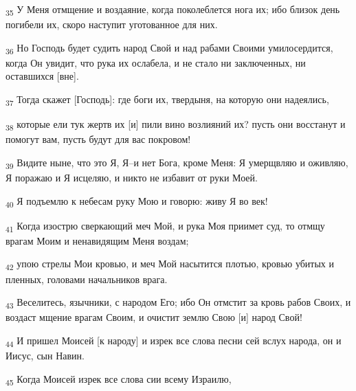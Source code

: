 \begin{tcolorbox}
\textsubscript{35} У Меня отмщение и воздаяние, когда поколеблется нога их; ибо близок день погибели их, скоро наступит уготованное для них.
\end{tcolorbox}
\begin{tcolorbox}
\textsubscript{36} Но Господь будет судить народ Свой и над рабами Своими умилосердится, когда Он увидит, что рука их ослабела, и не стало ни заключенных, ни оставшихся [вне].
\end{tcolorbox}
\begin{tcolorbox}
\textsubscript{37} Тогда скажет [Господь]: где боги их, твердыня, на которую они надеялись,
\end{tcolorbox}
\begin{tcolorbox}
\textsubscript{38} которые ели тук жертв их [и] пили вино возлияний их? пусть они восстанут и помогут вам, пусть будут для вас покровом!
\end{tcolorbox}
\begin{tcolorbox}
\textsubscript{39} Видите ныне, что это Я, Я--и нет Бога, кроме Меня: Я умерщвляю и оживляю, Я поражаю и Я исцеляю, и никто не избавит от руки Моей.
\end{tcolorbox}
\begin{tcolorbox}
\textsubscript{40} Я подъемлю к небесам руку Мою и говорю: живу Я во век!
\end{tcolorbox}
\begin{tcolorbox}
\textsubscript{41} Когда изострю сверкающий меч Мой, и рука Моя приимет суд, то отмщу врагам Моим и ненавидящим Меня воздам;
\end{tcolorbox}
\begin{tcolorbox}
\textsubscript{42} упою стрелы Мои кровью, и меч Мой насытится плотью, кровью убитых и пленных, головами начальников врага.
\end{tcolorbox}
\begin{tcolorbox}
\textsubscript{43} Веселитесь, язычники, с народом Его; ибо Он отмстит за кровь рабов Своих, и воздаст мщение врагам Своим, и очистит землю Свою [и] народ Свой!
\end{tcolorbox}
\begin{tcolorbox}
\textsubscript{44} И пришел Моисей [к народу] и изрек все слова песни сей вслух народа, он и Иисус, сын Навин.
\end{tcolorbox}
\begin{tcolorbox}
\textsubscript{45} Когда Моисей изрек все слова сии всему Израилю,
\end{tcolorbox}
